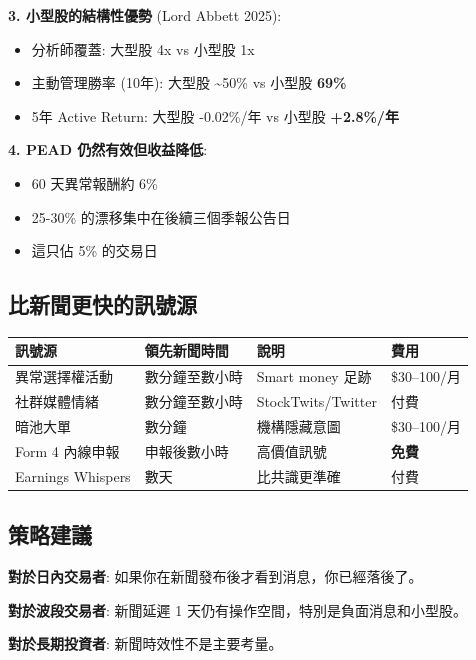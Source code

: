 \documentclass[11pt,a4paper]{article}
\begin{document}
\textbf{3. 小型股的結構性優勢} (Lord Abbett 2025):
\begin{itemize}
    \item 分析師覆蓋: 大型股 4x vs 小型股 1x
    \item 主動管理勝率 (10年): 大型股 \textasciitilde 50\% vs 小型股 \textbf{69\%}
    \item 5年 Active Return: 大型股 -0.02\%/年 vs 小型股 \textbf{+2.8\%/年}
\end{itemize}

\textbf{4. PEAD 仍然有效但收益降低}:
\begin{itemize}
    \item 60 天異常報酬約 6\%
    \item 25-30\% 的漂移集中在後續三個季報公告日
    \item 這只佔 5\% 的交易日
\end{itemize}

\subsection*{比新聞更快的訊號源}

\begin{table}[H]
\centering
\small
\begin{tabular}{@{}llll@{}}
\toprule
\textbf{訊號源} & \textbf{領先新聞時間} & \textbf{說明} & \textbf{費用} \\
\midrule
異常選擇權活動 & 數分鐘至數小時 & Smart money 足跡 & \$30--100/月 \\
社群媒體情緒 & 數分鐘至數小時 & StockTwits/Twitter & 付費 \\
暗池大單 & 數分鐘 & 機構隱藏意圖 & \$30--100/月 \\
Form 4 內線申報 & 申報後數小時 & 高價值訊號 & \textbf{免費} \\
Earnings Whispers & 數天 & 比共識更準確 & 付費 \\
\bottomrule
\end{tabular}
\end{table}

\subsection*{策略建議}

\textbf{對於日內交易者}: 如果你在新聞發布後才看到消息，你已經落後了。

\textbf{對於波段交易者}: 新聞延遲 1 天仍有操作空間，特別是負面消息和小型股。

\textbf{對於長期投資者}: 新聞時效性不是主要考量。
\end{document}
